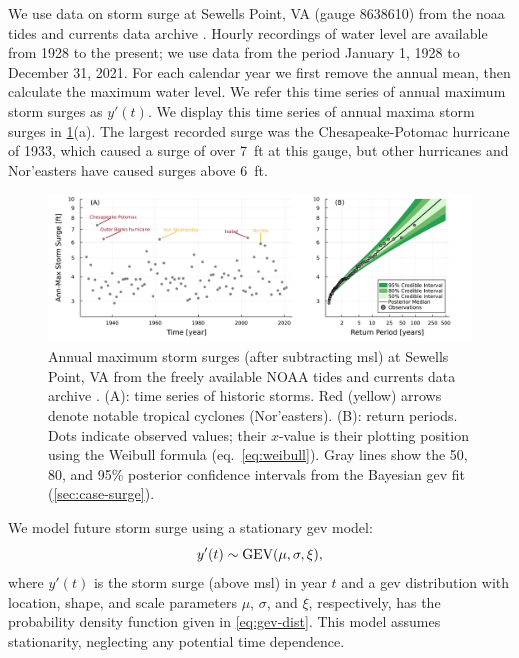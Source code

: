 \documentclass{agujournal2019}
\begin{document}
We use data on storm surge at Sewells Point, VA (gauge 8638610) from the \gls{noaa} tides and currents data archive \cite{noaa_tidesandcurrents:2022}.
Hourly recordings of water level are available from 1928 to the present; we use data from the period January 1, 1928 to December 31, 2021.
For each calendar year we first remove the annual mean, then calculate the maximum water level.
We refer this time series of annual maximum storm surges as $y'(t)$.
We display this time series of annual maxima storm surges in \cref{fig:surge-obs-return}(a).
The largest recorded surge was the Chesapeake-Potomac hurricane of 1933, which caused a surge of over \SI{7}{ft} at this gauge, but other hurricanes and Nor'easters have caused surges above \SI{6}{ft}.

\begin{figure}
  \centering
  \includegraphics[width=\textwidth]{surge-obs-return}
  \caption{
    Annual maximum storm surges (after subtracting \acrlong{msl}) at Sewells Point, VA from the freely available NOAA tides and currents data archive \protect\cite{noaa_tidesandcurrents:2022}.
    (A):
    time series of historic storms.
    Red (yellow) arrows denote notable tropical cyclones (Nor'easters).
    (B):
    return periods.
    Dots indicate observed values; their $x$-value is their plotting position using the Weibull formula (eq.~\ref{eq:weibull}).
    Gray lines show the 50, 80, and 95\% posterior confidence intervals from the Bayesian \gls{gev} fit (\cref{sec:case-surge}).
  }\label{fig:surge-obs-return}
\end{figure}

We model future storm surge using a stationary \gls{gev} model:
\begin{equation}\label{eq:surge-model}
  y'(t) \sim \text{GEV}\qty(\mu, \sigma, \xi),
\end{equation}
where $y'(t)$ is the storm surge (above \gls{msl}) in year $t$ and a \gls{gev} distribution with location, shape, and scale parameters $\mu$, $\sigma$, and $\xi$, respectively, has the probability density function given in \cref{eq:gev-dist}.
This model assumes stationarity, neglecting any potential time dependence.
\end{document}
